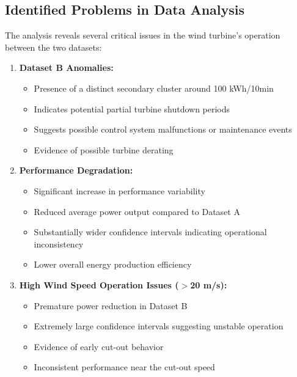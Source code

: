 \documentclass[a4paper,11pt]{article}
\begin{document}
\begin{mdframed}[linecolor=red,linewidth=2pt]
{\color{red}  %
\section*{Identified Problems in Data Analysis}

The analysis reveals several critical issues in the wind turbine's operation between the two datasets:

\begin{enumerate}
    \item \textbf{Dataset B Anomalies:}
    \begin{itemize}
        \item Presence of a distinct secondary cluster around 100 kWh/10min
        \item Indicates potential partial turbine shutdown periods
        \item Suggests possible control system malfunctions or maintenance events
        \item Evidence of possible turbine derating
    \end{itemize}

    \item \textbf{Performance Degradation:}
    \begin{itemize}
        \item Significant increase in performance variability
        \item Reduced average power output compared to Dataset A
        \item Substantially wider confidence intervals indicating operational inconsistency
        \item Lower overall energy production efficiency
    \end{itemize}

    \item \textbf{High Wind Speed Operation Issues ($>$20 m/s):}
    \begin{itemize}
        \item Premature power reduction in Dataset B
        \item Extremely large confidence intervals suggesting unstable operation
        \item Evidence of early cut-out behavior
        \item Inconsistent performance near the cut-out speed
    \end{itemize}


\end{enumerate}}
\end{mdframed}
\end{document}
